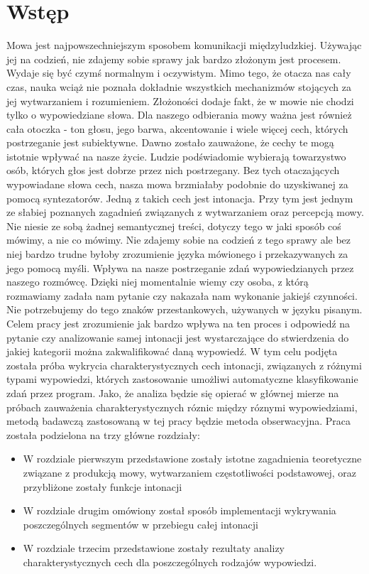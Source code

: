 \documentclass[a4paper,12 pt]{article}
\begin{document}
\section*{Wstęp}
Mowa jest najpowszechniejszym sposobem komunikacji międzyludzkiej. Używając jej na codzień, nie zdajemy sobie sprawy jak bardzo złożonym jest procesem. Wydaje się być czymś normalnym i oczywistym. Mimo tego, że otacza nas cały czas, nauka wciąż nie poznała dokładnie wszystkich mechanizmów stojących za jej wytwarzaniem i rozumieniem. Złożoności dodaje fakt, że w mowie nie chodzi tylko o wypowiedziane słowa. Dla naszego odbierania mowy ważna jest również cała otoczka - ton głosu, jego barwa, akcentowanie i wiele więcej cech, których postrzeganie jest subiektywne. Dawno zostało zauważone, że cechy te mogą istotnie wpływać na nasze życie. Ludzie podświadomie wybierają towarzystwo osób, których głos jest dobrze przez nich postrzegany. Bez tych otaczających wypowiadane słowa cech, nasza mowa brzmiałaby podobnie do uzyskiwanej za pomocą syntezatorów.
\newline
Jedną z takich cech jest intonacja. Przy tym jest jednym ze słabiej poznanych zagadnień związanych z wytwarzaniem oraz percepcją mowy. Nie niesie ze sobą żadnej semantycznej treści, dotyczy tego w jaki sposób coś mówimy, a nie co mówimy. Nie zdajemy sobie na codzień z tego sprawy ale bez niej bardzo trudne byłoby zrozumienie języka mówionego i przekazywanych za jego pomocą myśli. Wpływa na nasze postrzeganie zdań wypowiedzianych przez naszego rozmówcę. Dzięki niej momentalnie wiemy czy osoba, z którą rozmawiamy zadała nam pytanie czy nakazała nam wykonanie jakiejś czynności. Nie potrzebujemy do tego znaków przestankowych, używanych w języku pisanym.
\newline
Celem pracy jest zrozumienie jak bardzo wpływa na ten proces i odpowiedź na pytanie czy analizowanie samej intonacji jest wystarczające do stwierdzenia do jakiej kategorii można zakwalifikować daną wypowiedź. W tym celu podjęta została próba wykrycia charakterystycznych cech intonacji, związanych z różnymi typami wypowiedzi, których zastosowanie umożliwi automatyczne klasyfikowanie zdań przez program.
\newline
Jako, że analiza będzie się opierać w głównej mierze na próbach zauważenia charakterystycznych róznic między róznymi wypowiedziami, metodą badawczą zastosowaną w tej pracy będzie metoda obserwacyjna.
\newpage
Praca została podzielona na trzy główne rozdziały:
\begin{itemize}
\item{W rozdziale pierwszym przedstawione zostały istotne zagadnienia teoretyczne związane z produkcją mowy, wytwarzaniem częstotliwości podstawowej,
oraz przybliżone zostały funkcje intonacji}
\item{W rozdziale drugim omówiony został sposób implementacji wykrywania poszczególnych segmentów w przebiegu całej intonacji}
\item{W rozdziale trzecim przedstawione zostały rezultaty analizy charakterystycznych cech dla poszczególnych rodzajów wypowiedzi.}
\end{itemize}
\newpage
\end{document}
